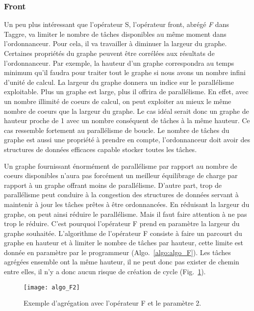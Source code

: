 \subsubsection{Front}
Un peu plus intéressant que l'opérateur S, l'opérateur front, abrégé {\em F} dans Taggre, va limiter le nombre de tâches disponibles au même moment dans l'ordonnanceur.
%
Pour cela, il va travailler à diminuer la largeur du graphe.
%
Certaines propriétés du graphe peuvent être corrélées aux résultats de l'ordonnanceur.
%
Par exemple, la hauteur d'un graphe correspondra au temps minimum qu'il faudra pour traiter tout le graphe si nous avons un nombre infini d'unité de calcul.
%
La largeur du graphe donnera un indice sur le parallélisme exploitable.
%
Plus un graphe est large, plus il offrira de parallélisme.
%
En effet, avec un nombre illimité de coeurs de calcul, on peut exploiter au mieux le même nombre de coeurs que la largeur du graphe.
%
Le cas idéal serait donc un graphe de hauteur proche de 1 avec un nombre conséquent de tâches à la même hauteur.
%
Ce cas ressemble fortement au parallélisme de boucle.
%
Le nombre de tâches du graphe est aussi une propriété à prendre en compte, l'ordonnanceur doit avoir des structures de données efficaces capable stocker toutes les tâches.



Un graphe fournissant énormément de parallélisme par rapport au nombre de coeurs disponibles n'aura pas forcément un meilleur équilibrage de charge par rapport à un graphe offrant moins de parallélisme.
%
D'autre part, trop de parallélisme peut conduire à la congestion des structures de données servant à maintenir à jour les tâches prêtes à être ordonnancées.
%
En réduisant la largeur du graphe, on peut ainsi réduire le parallélisme.
%
Mais il faut faire attention à ne pas trop le réduire.
%
C'est pourquoi l'opérateur F prend en paramètre la largeur du graphe souhaitée.
%
L'algorithme de l'opérateur F consiste à faire un parcourt du graphe en hauteur et à limiter le nombre de tâches par hauteur, cette limite est donnée en paramètre par le programmeur (Algo.~\ref{algo:algo_F}).
%
Les tâches agrégées ensemble ont la même hauteur, il ne peut donc pas exister de chemin entre elles, il n'y a donc aucun risque de création de cycle (Fig.~\ref{fig:algo_F2}).


\begin{figure}[t!]
  \centering
  \texttt{[image: algo\_F2]}
  \caption{Exemple d'agrégation avec l'opérateur F et le paramètre 2.}
  \label{fig:algo_F2}
\end{figure}

